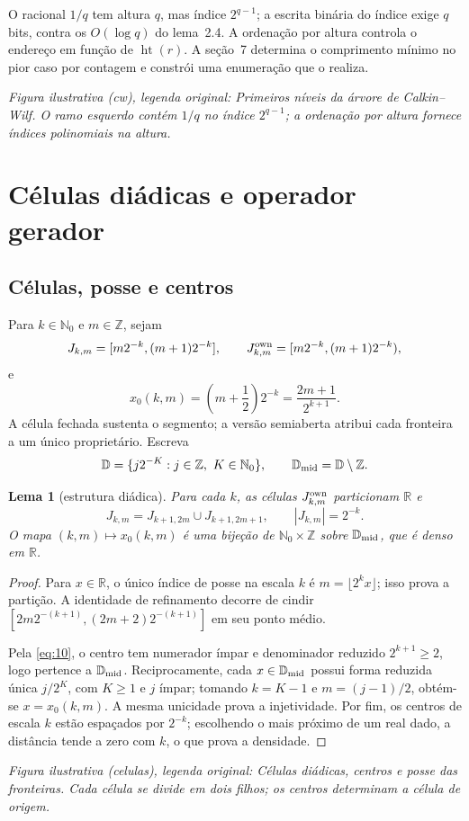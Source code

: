 \documentclass[11pt,a4paper]{article}
\theoremstyle{preciso}
\newtheorem{lema}[teorema]{Lema}
\theoremstyle{definition}
\newcommand{\N}{\mathbb N}
\newcommand{\Z}{\mathbb Z}
\newcommand{\R}{\mathbb R}
\newcommand{\D}{\mathbb D}
\newcommand{\heightq}{\operatorname{ht}}
\newcommand{\eqn}[2]{\begin{equation}\label{eq:#1}#2\end{equation}}
\newcommand{\figura}[4]{\par\noindent\textit{Figura ilustrativa (#4), legenda original: #3}\par}
\begin{document}
O racional $1/q$ tem altura $q$, mas índice $2^{q-1}$; a escrita binária do índice exige $q$ bits, contra os $O(\log q)$ do lema~2.4. A ordenação por altura controla o endereço em função de $\heightq(r)$. A seção~7 determina o comprimento mínimo no pior caso por contagem e constrói uma enumeração que o realiza.
\figura{01_calkin_wilf}{.94}{Primeiros níveis da árvore de Calkin--Wilf. O ramo esquerdo contém $1/q$ no índice $2^{q-1}$; a ordenação por altura fornece índices polinomiais na altura.}{cw}

\section{Células diádicas e operador gerador}
\subsection{Células, posse e centros}
Para $k\in\N_0$ e $m\in\Z$, sejam
\eqn{09}{J_{k,m}=[m2^{-k},(m+1)2^{-k}],\qquad J_{k,m}^{\rm own}=[m2^{-k},(m+1)2^{-k}),}
e
\eqn{10}{x_0(k,m)=\left(m+\frac12\right)2^{-k}=\frac{2m+1}{2^{k+1}}.}
A célula fechada sustenta o segmento; a versão semiaberta atribui cada fronteira a um único proprietário. Escreva
\[
\D=\{j2^{-K}:j\in\Z,\ K\in\N_0\},\qquad \D_{\rm mid}=\D\setminus\Z.
\]
\begin{lema}[estrutura diádica]
Para cada $k$, as células $J_{k,m}^{\rm own}$ particionam $\R$ e
\eqn{11}{J_{k,m}=J_{k+1,2m}\cup J_{k+1,2m+1},\qquad |J_{k,m}|=2^{-k}.}
O mapa $(k,m)\mapsto x_0(k,m)$ é uma bijeção de $\N_0\times\Z$ sobre $\D_{\rm mid}$, que é denso em $\R$.
\end{lema}
\begin{proof}
Para $x\in\R$, o único índice de posse na escala $k$ é $m=\lfloor2^kx\rfloor$; isso prova a partição. A identidade de refinamento decorre de cindir $[2m2^{-(k+1)},(2m+2)2^{-(k+1)}]$ em seu ponto médio.

Pela \eqref{eq:10}, o centro tem numerador ímpar e denominador reduzido $2^{k+1}\ge2$, logo pertence a $\D_{\rm mid}$. Reciprocamente, cada $x\in\D_{\rm mid}$ possui forma reduzida única $j/2^K$, com $K\ge1$ e $j$ ímpar; tomando $k=K-1$ e $m=(j-1)/2$, obtém-se $x=x_0(k,m)$. A mesma unicidade prova a injetividade. Por fim, os centros de escala $k$ estão espaçados por $2^{-k}$; escolhendo o mais próximo de um real dado, a distância tende a zero com $k$, o que prova a densidade.
\end{proof}
\figura{02_celulas}{.92}{Células diádicas, centros e posse das fronteiras. Cada célula se divide em dois filhos; os centros determinam a célula de origem.}{celulas}
\end{document}

